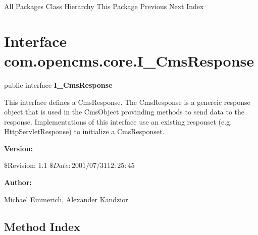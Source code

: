 \begin{PRE}
All Packages  Class Hierarchy  This Package  Previous  Next  Index
\end{PRE}

\htmlHR

\section{  Interface com.opencms.core.I\_CmsResponse }

\begin{description}
\item public interface {\bf I\_CmsResponse} 
\end{description}

This interface defines a CmsResponse. The CmsResponse is a genereic response
object that is used in the CmsObject provinding methods to send data to the
response. Implementations of this interface use an existing responset (e.g.
HttpServletResponse) to initialize a CmsResponset. 

\begin{description}
\item {\bf Version:}  

\$Revision: 1.1 $ \$Date: 2001/07/31 12:25:45 $  
\item {\bf Author:}  

Michael Emmerich, Alexander Kandzior 
\end{description}

\htmlHR

\subsection*{  Method Index }

